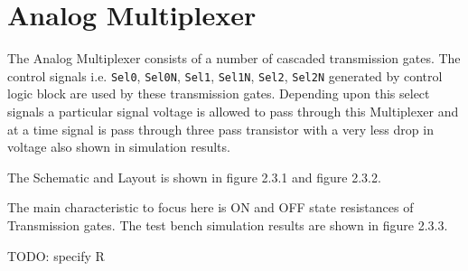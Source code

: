 \documentclass[parskip,oneside,colorbacktitle,10pt,accentcolor=tud1b]{tudreport}
\begin{document}
{\chapter{Analog Multiplexer}

The Analog Multiplexer consists of a number of cascaded transmission gates. The control signals i.e. \texttt{Sel0}, \texttt{Sel0N}, \texttt{Sel1}, \texttt{Sel1N}, \texttt{Sel2}, \texttt{Sel2N} generated by control logic block are used by these transmission gates. Depending upon this select signals a particular signal voltage is allowed to pass through this Multiplexer and at a time signal is pass through three pass transistor with a very less drop in voltage also shown in simulation results. 

The Schematic and Layout is shown in figure 2.3.1 and figure 2.3.2. 

The main characteristic to focus here is ON and OFF state resistances of Transmission gates. The test bench simulation results are shown in figure 2.3.3.

TODO: specify R

}
\end{document}
